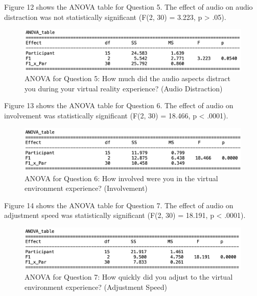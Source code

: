 \documentclass[manuscript,screen,review]{acmart}
\begin{document}
Figure 12 shows the ANOVA table for Question 5. The effect of audio on audio distraction was not statistically significant (F(2, 30) = 3.223, p > .05).

\begin{figure}[ht]
  \centering
  \includegraphics[width=\linewidth]{Q5ANOVA.png}
  \caption{ANOVA for Question 5:  How much did the audio aspects distract you during your virtual reality experience? (Audio Distraction)}
\end{figure}


Figure 13 shows the ANOVA table for Question 6. The effect of audio on involvement was statistically significant (F(2, 30) = 18.466, p < .0001).

\begin{figure}[ht]
  \centering
  \includegraphics[width=\linewidth]{Q6ANOVA.png}
  \caption{ANOVA for Question 6:  How involved were you in the virtual environment experience? (Involvement)}
\end{figure}


Figure 14 shows the ANOVA table for Question 7. The effect of audio on adjustment speed was statistically significant (F(2, 30) = 18.191, p < .0001).

\begin{figure}[ht]
  \centering
  \includegraphics[width=\linewidth]{Q7ANOVA.png}
  \caption{ANOVA for Question 7:  How quickly did you adjust to the virtual environment experience? (Adjustment Speed)}
\end{figure}
\end{document}
